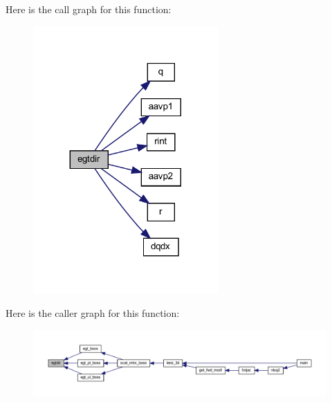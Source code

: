 Here is the call graph for this function\+:\nopagebreak
\begin{figure}[H]
\begin{center}
\leavevmode
\includegraphics[width=200pt]{Leroi_8f90_a24151574c4bb3d7844db88f91d23b589_cgraph}
\end{center}
\end{figure}
Here is the caller graph for this function\+:\nopagebreak
\begin{figure}[H]
\begin{center}
\leavevmode
\includegraphics[width=350pt]{Leroi_8f90_a24151574c4bb3d7844db88f91d23b589_icgraph}
\end{center}
\end{figure}
\mbox{\label{Leroi_8f90_a7312ba6fbf8b492624e2663b1255893f}} 
